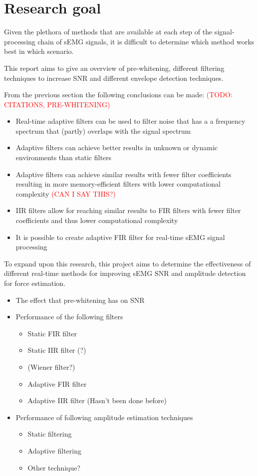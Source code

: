 \section{Research goal}
Given the plethora of methods that are available at each step of the signal-processing chain of sEMG signals, it is difficult to determine which method works best in which scenario.

This report aims to give an overview of pre-whitening, different filtering techniques to increase SNR and different envelope detection techniques.

From the previous section the following conclusions can be made: \textcolor{red}{(TODO: CITATIONS, PRE-WHITENING)}
\begin{itemize}


    \item Real-time adaptive filters can be used to filter noise that has a a frequency spectrum that (partly) overlaps with the signal spectrum
    \item Adaptive filters can achieve better results in unknown or dynamic environments than static filters
    \item Adaptive filters can achieve similar results with fewer filter coefficients resulting in more memory-efficient filters with lower computational complexity \textcolor{red}{(CAN I SAY THIS?)}
    \item IIR filters allow for reaching similar results to FIR filters with fewer filter coefficients and thus lower computational complexity
    \item It is possible to create adaptive FIR filter for real-time sEMG signal processing
\end{itemize}

To expand upon this research, this project aims to determine the effectiveness of different real-time methods for improving sEMG SNR and amplitude detection for force estimation.


\begin{itemize}
    \item The effect that pre-whitening has on SNR
    \item Performance of the following filters
    \begin{itemize}
        \item Static FIR filter
        \item Static IIR filter (?)
        \item (Wiener filter?)
        \item Adaptive FIR filter
        \item Adaptive IIR filter (Hasn't been done before)
    \end{itemize}
    \item Performance of following amplitude estimation techniques
    \begin{itemize}
        \item Static filtering
        \item Adaptive filtering
        \item Other technique?
    \end{itemize}
\end{itemize}

